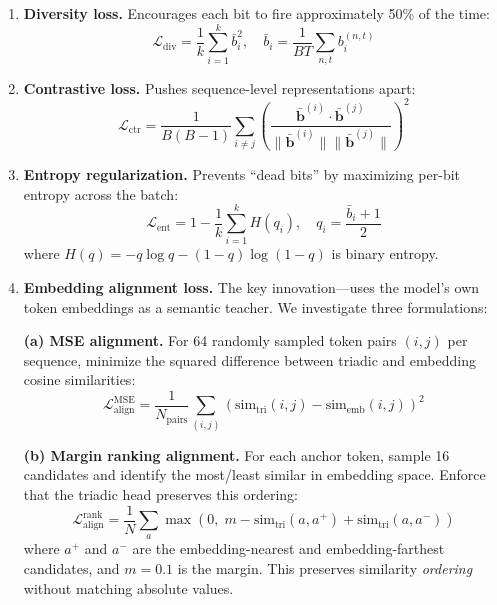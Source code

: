 \documentclass[11pt,a4paper]{article}
\newcommand{\loss}[1]{\mathcal{L}_{\text{#1}}}
\begin{document}
\begin{enumerate}
    \item \textbf{Diversity loss.} Encourages each bit to fire approximately 50\% of the time:
    \begin{equation}
        \loss{div} = \frac{1}{k} \sum_{i=1}^{k} \bar{b}_i^2, \quad \bar{b}_i = \frac{1}{BT}\sum_{n,t} b_i^{(n,t)}
    \end{equation}

    \item \textbf{Contrastive loss.} Pushes sequence-level representations apart:
    \begin{equation}
        \loss{ctr} = \frac{1}{B(B-1)} \sum_{i \neq j} \left(\frac{\bar{\mathbf{b}}^{(i)} \cdot \bar{\mathbf{b}}^{(j)}}{\|\bar{\mathbf{b}}^{(i)}\| \|\bar{\mathbf{b}}^{(j)}\|}\right)^2
    \end{equation}

    \item \textbf{Entropy regularization.} Prevents ``dead bits'' by maximizing per-bit entropy across the batch:
    \begin{equation}
        \loss{ent} = 1 - \frac{1}{k} \sum_{i=1}^{k} H(q_i), \quad q_i = \frac{\bar{b}_i + 1}{2}
    \end{equation}
    where $H(q) = -q\log q - (1-q)\log(1-q)$ is binary entropy.

    \item \textbf{Embedding alignment loss.} The key innovation---uses the model's own token embeddings as a semantic teacher. We investigate three formulations:

    \textbf{(a) MSE alignment.} For 64 randomly sampled token pairs $(i,j)$ per sequence, minimize the squared difference between triadic and embedding cosine similarities:
    \begin{equation}
        \loss{align}^{\text{MSE}} = \frac{1}{N_{\text{pairs}}} \sum_{(i,j)} \left( \text{sim}_{\text{tri}}(i,j) - \text{sim}_{\text{emb}}(i,j) \right)^2
        \label{eq:align_mse}
    \end{equation}

    \textbf{(b) Margin ranking alignment.} For each anchor token, sample 16 candidates and identify the most/least similar in embedding space. Enforce that the triadic head preserves this ordering:
    \begin{equation}
        \loss{align}^{\text{rank}} = \frac{1}{N} \sum_a \max\left(0,\; m - \text{sim}_{\text{tri}}(a, a^+) + \text{sim}_{\text{tri}}(a, a^-)\right)
        \label{eq:align_rank}
    \end{equation}
    where $a^+$ and $a^-$ are the embedding-nearest and embedding-farthest candidates, and $m = 0.1$ is the margin. This preserves similarity \emph{ordering} without matching absolute values.


\end{enumerate}
\end{document}
